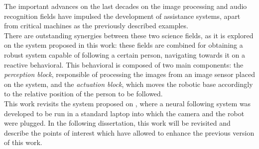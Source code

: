 The important advances on the last decades on the image processing and audio recognition fields have impulsed the development of assistance systems, apart from critical machines as the previously described examples.\\



There are outstanding synergies between these two science fields, as it is explored on the system proposed in this work: these fields are combined for obtaining a robust system capable of following a certain person, navigating towards it on a reactive behavioral. This behavioral is composed of two main components: the \textit{perception block}, responsible of processing the images from an image sensor placed on the system, and the \textit{actuation block}, which moves the robotic base accordingly to the relative position of the person to be followed.\\

This work revisits the system proposed on \cite{tfg}, where a neural following system was developed to be run in a standard laptop into which the camera and the robot were plugged. In the following dissertation, this work will be revisited and describe the points of interest which have allowed to enhance the previous version of this work.\\
	
